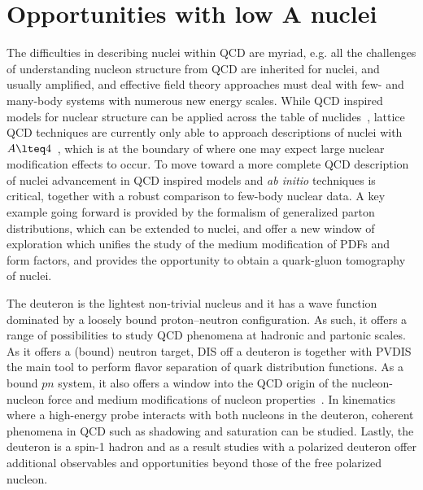 \section{Opportunities with low $\mathbf{A}$ nuclei\label{sec:light}}
%
The difficulties in describing nuclei within QCD are myriad, e.g. all the challenges of understanding nucleon structure from QCD are inherited for nuclei, and usually amplified, and effective field theory approaches must deal with few- and many-body systems with numerous new energy scales. While QCD inspired models for nuclear structure can be applied across the table of nuclides~\cite{Cloet:2006bq,Cloet:2015tha,Stone:2017oqt,Stone:2016qmi}, lattice QCD 
techniques are currently only able to approach descriptions of nuclei with $A \lteq 4$~\cite{Chang:2015qxa}, which is at the boundary of where one may expect large nuclear modification effects to occur. To move toward a more complete QCD description of nuclei advancement in QCD inspired models and {\it ab initio} techniques is critical, together with a robust comparison to few-body nuclear data. A key example going forward is provided by the formalism of generalized parton distributions, which can be extended to nuclei, and offer a new window of exploration which unifies the study of the medium modification of PDFs and form factors, and provides the opportunity to obtain a quark-gluon tomography of nuclei. 



The deuteron is the lightest non-trivial nucleus and it has a wave function dominated by a loosely bound proton--neutron configuration.  As such, it offers a range of possibilities to study QCD phenomena at hadronic and partonic scales.  As it offers a (bound) neutron target, DIS off a deuteron is together with PVDIS the main tool to perform flavor separation of quark distribution functions.  As a bound $pn$ system, it also offers a window into the QCD origin of the nucleon-nucleon force and medium modifications of nucleon properties~\cite{Boeglin:2015cha}.  In kinematics where a high-energy probe interacts with both nucleons in the deuteron, coherent phenomena in QCD such as shadowing and saturation can be studied.  Lastly, the deuteron is a spin-1 hadron and as a result studies with a polarized deuteron offer additional observables and opportunities beyond those of the free polarized nucleon.

